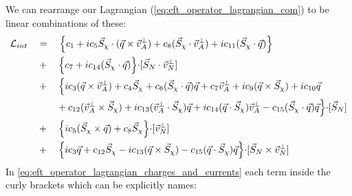 \par
We can rearrange our Lagrangian (\autoref{eq:eft_operator_lagrangian_com}) to be linear combinations of these:
\begin{equation}
\begin{split}
    \mathcal{L}_{int}\quad  & =\quad \Bigl\{ c_1 + ic_{5}\vec{S}_{\chi} \cdot (\vec{q} \times \vec{v}^{\perp}_{A}) + c_8 (\vec{S}_{\chi} \cdot \vec{v}^{\perp}_{A}) + ic_{11} (\vec{S}_{\chi} \cdot \vec{q} ) \Bigl\} \\
                            & +\quad \Bigl\{ c_7 + ic_{14}(\vec{S}_{\chi} \cdot \vec{q}) \Bigl\} \cdot [\vec{S}_{N} \cdot \vec{v}^{\perp}_{N}] \\
                            & +\quad \Bigl\{ ic_3 (\vec{q} \times \vec{v}^{\perp}_{A}) + c_4\vec{S}_{\chi} + c_6 (\vec{S}_{\chi} \cdot \vec{q} ) \vec{q} + c_7 \vec{v}^{\perp}_{A} + ic_9 ( \vec{q} \times \vec{S}_{\chi} ) + ic_{10} \vec{q} \\
                            & \qquad+ c_{12} (\vec{v}^{\perp}_{A} \times \vec{S}_{\chi}) + ic_{13} (\vec{v}^{\perp}_{A} \cdot \vec{S}_{\chi}) \vec{q} + ic_{14}(\vec{q} \cdot \vec{S}_{\chi})\vec{v}^{\perp}_{A} - c_{15}(\vec{S}_{\chi} \cdot \vec{q}) \vec{q} \Bigl\} \cdot [\vec{S}_{N}] \\
                            & +\quad \Bigl\{ ic_5 (\vec{S}_{\chi} \times \vec{q}) + c_8 \vec{S}_{\chi} \Bigl\} \cdot [\vec{v}^{\perp}_{N}] \\
                            & +\quad \Bigl\{ ic_3 \vec{q} + c_{12} \vec{S}_{\chi} - ic_{13} (\vec{q} \times \vec{S}_{\chi}) - c_{15} (\vec{q} \cdot \vec{S}_{\chi}) \vec{q} \Bigl\} \cdot [\vec{S}_{N} \times \vec{v}^{\perp}_{N}] 
\end{split}
\label{eq:eft_operator_lagrangian_charges_and_currents}
\end{equation}
In \autoref{eq:eft_operator_lagrangian_charges_and_currents} each term inside the curly brackets which can be explicitly names:
